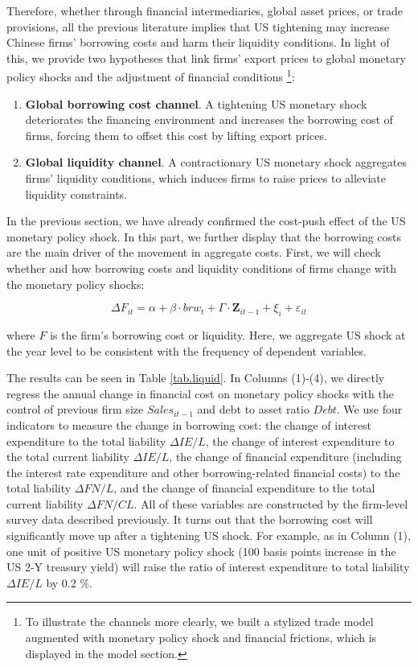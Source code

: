 Therefore, whether through financial intermediaries, global asset prices, or trade provisions, all the previous literature implies that US tightening may increase Chinese firms' borrowing costs and harm their liquidity conditions. In light of this, we provide two hypotheses that link firms' export prices to global monetary policy shocks and the adjustment of financial conditions \footnote{To illustrate the channels more clearly, we built a stylized trade model augmented with monetary policy shock and financial frictions, which is displayed in the model section.}:

\begin{enumerate}
    \item \textbf{Global borrowing cost channel}. A tightening US monetary shock deteriorates the financing environment and increases the borrowing cost of firms, forcing them to offset this cost by lifting export prices.
    \item \textbf{Global liquidity channel}. A contractionary US monetary shock aggregates firms' liquidity conditions, which induces firms to raise prices to alleviate liquidity constraints.
\end{enumerate}

In the previous section, we have already confirmed the cost-push effect of the US monetary policy shock. In this part, we further display that the borrowing costs are the main driver of the movement in aggregate costs. First, we will check whether and how borrowing costs and liquidity conditions of firms change with the monetary policy shocks:

\begin{equation}
    \Delta F_{it} = \alpha +\beta \cdot brw_{t}+ \Gamma \cdot \textbf{Z}_{it-1}+\xi_{i}+\varepsilon_{it} \label{reg.liquid}
\end{equation}

where $F$ is the firm's borrowing cost or liquidity. Here, we aggregate US shock at the year level to be consistent with the frequency of dependent variables.

The results can be seen in Table \ref{tab.liquid}. In Columns (1)-(4), we directly regress the annual change in financial cost on monetary policy shocks with the control of previous firm size $Sales_{it-1}$ and debt to asset ratio $Debt$. We use four indicators to measure the change in borrowing cost: the change of interest expenditure to the total liability $\Delta IE/L$, the change of interest expenditure to the total current liability $\Delta IE/L$, the change of financial expenditure (including the interest rate expenditure and other borrowing-related financial costs) to the total liability $\Delta FN/L$, and the change of financial expenditure to the total current liability $\Delta FN/CL$. All of these variables are constructed by the firm-level survey data described previously. It turns out that the borrowing cost will significantly move up after a tightening US shock. For example, as in Column (1), one unit of positive US monetary policy shock (100 basis points increase in the US 2-Y treasury yield) will raise the ratio of interest expenditure to total liability $\Delta IE/L$ by 0.2 $\%$. 

